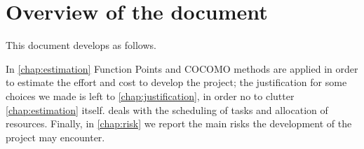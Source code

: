 \section{Overview of the document} 
This document develops as follows.

In \cref{chap:estimation} Function Points and COCOMO methods are applied in order to estimate the effort and cost to develop the project; the justification for some choices we made is left to \cref{chap:justification}, in order no to clutter \cref{chap:estimation} itself.  deals with the scheduling of tasks and allocation of resources. Finally, in \cref{chap:risk} we report the main risks the development of the project may encounter. 





